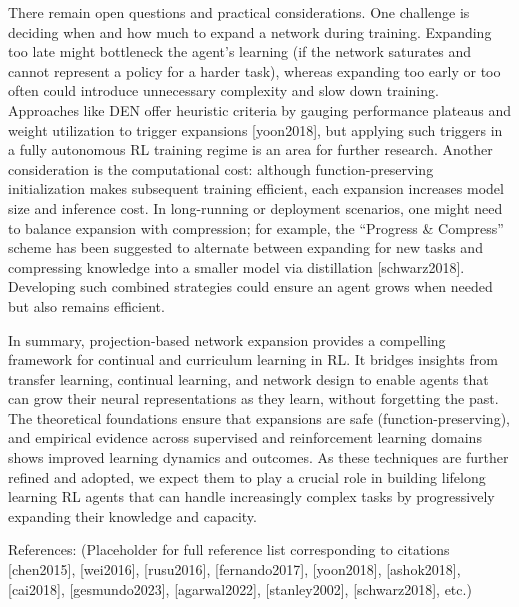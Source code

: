 There remain open questions and practical considerations. One challenge is deciding when and how much to expand a network during training. Expanding too late might bottleneck the agent’s learning (if the network saturates and cannot represent a policy for a harder task), whereas expanding too early or too often could introduce unnecessary complexity and slow down training. Approaches like DEN offer heuristic criteria by gauging performance plateaus and weight utilization to trigger expansions [yoon2018], but applying such triggers in a fully autonomous RL training regime is an area for further research. Another consideration is the computational cost: although function-preserving initialization makes subsequent training efficient, each expansion increases model size and inference cost. In long-running or deployment scenarios, one might need to balance expansion with compression; for example, the “Progress & Compress” scheme has been suggested to alternate between expanding for new tasks and compressing knowledge into a smaller model via distillation [schwarz2018]. Developing such combined strategies could ensure an agent grows when needed but also remains efficient.

In summary, projection-based network expansion provides a compelling framework for continual and curriculum learning in RL. It bridges insights from transfer learning, continual learning, and network design to enable agents that can grow their neural representations as they learn, without forgetting the past. The theoretical foundations ensure that expansions are safe (function-preserving), and empirical evidence across supervised and reinforcement learning domains shows improved learning dynamics and outcomes. As these techniques are further refined and adopted, we expect them to play a crucial role in building lifelong learning RL agents that can handle increasingly complex tasks by progressively expanding their knowledge and capacity.

References: (Placeholder for full reference list corresponding to citations [chen2015], [wei2016], [rusu2016], [fernando2017], [yoon2018], [ashok2018], [cai2018], [gesmundo2023], [agarwal2022], [stanley2002], [schwarz2018], etc.)